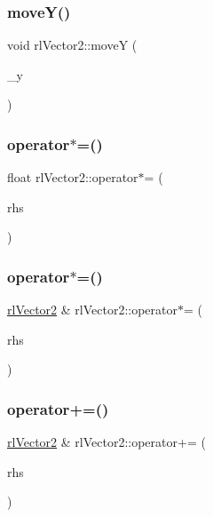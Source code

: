 \subsubsection{\texorpdfstring{move\+Y()}{moveY()}}
{\footnotesize\ttfamily void rl\+Vector2\+::moveY (\begin{DoxyParamCaption}\item[{const float \&}]{\+\_\+y }\end{DoxyParamCaption})}

\mbox{\label{classrl_vector2_a42f1d9dbdda703d0a39d1da6692c6af0}} 
\subsubsection{\texorpdfstring{operator$\ast$=()}{operator*=()}\hspace{0.1cm}{\footnotesize\ttfamily [1/2]}}
{\footnotesize\ttfamily float rl\+Vector2\+::operator$\ast$= (\begin{DoxyParamCaption}\item[{\hyperlink{classrl_vector2}{rl\+Vector2}}]{rhs }\end{DoxyParamCaption})}

\mbox{\label{classrl_vector2_a06494db8211867fb87c23d8a27a1ec8d}} 
\subsubsection{\texorpdfstring{operator$\ast$=()}{operator*=()}\hspace{0.1cm}{\footnotesize\ttfamily [2/2]}}
{\footnotesize\ttfamily \hyperlink{classrl_vector2}{rl\+Vector2} \& rl\+Vector2\+::operator$\ast$= (\begin{DoxyParamCaption}\item[{const float \&}]{rhs }\end{DoxyParamCaption})}

\mbox{\label{classrl_vector2_a0c7daa76b39d3e97059bb5267504ed3c}} 
\subsubsection{\texorpdfstring{operator+=()}{operator+=()}}
{\footnotesize\ttfamily \hyperlink{classrl_vector2}{rl\+Vector2} \& rl\+Vector2\+::operator+= (\begin{DoxyParamCaption}\item[{\hyperlink{classrl_vector2}{rl\+Vector2}}]{rhs }\end{DoxyParamCaption})}

